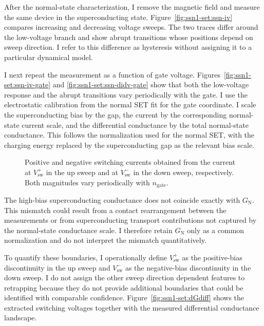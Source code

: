             After the normal-state characterization, I remove the magnetic field and measure the same device in the superconducting state. Figure~\ref{fig:ssn1-set:ssn-iv} compares increasing and decreasing voltage sweeps. The two traces differ around the low-voltage branch and show abrupt transitions whose positions depend on sweep direction. I refer to this difference as hysteresis without assigning it to a particular dynamical model.

            I next repeat the measurement as a function of gate voltage. Figures~\ref{fig:ssn1-set:ssn-iv-gate} and \ref{fig:ssn1-set:ssn-didv-gate} show that both the low-voltage response and the abrupt transitions vary periodically with the gate. I use the electrostatic calibration from the normal SET fit for the gate coordinate. I scale the superconducting bias by the gap, the current by the corresponding normal-state current scale, and the differential conductance by the total normal-state conductance. This follows the normalization used for the normal SET, with the charging energy replaced by the superconducting gap as the relevant bias scale.

            \begin{figure}
                \captionsetup{format=plain}%
                \centering
                \vspace{-1.0em}
                \vspace{-1.0em}
                \caption{
                        Positive and negative switching currents obtained from the current at $V_\mathrm{sw}^{+}$ in the up sweep and at $V_\mathrm{sw}^{-}$ in the down sweep, respectively. Both magnitudes vary periodically with $n_\mathrm{gate}$.
                    }
                \label{fig:ssn1-set:Ic}
            \end{figure}

            The high-bias superconducting conductance does not coincide exactly with $G_\mathrm{N}$. This mismatch could result from a contact rearrangement between the measurements or from superconducting transport contributions not captured by the normal-state conductance scale. I therefore retain $G_\mathrm{N}$ only as a common normalization and do not interpret the mismatch quantitatively.

            To quantify these boundaries, I operationally define $V_\mathrm{sw}^{+}$ as the positive-bias discontinuity in the up sweep and $V_\mathrm{sw}^{-}$ as the negative-bias discontinuity in the down sweep. I do not assign the other sweep direction dependent features to retrapping because they do not provide additional boundaries that could be identified with comparable confidence. Figure~\ref{fig:ssn1-set:dGdiff} shows the extracted switching voltages together with the measured differential conductance landscape.

